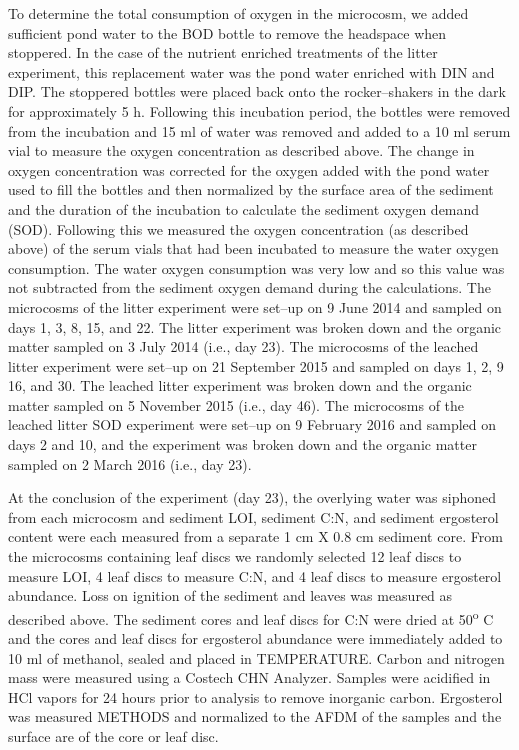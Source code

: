 To determine the total consumption of oxygen in the microcosm, we added sufficient pond water to the BOD bottle to remove the headspace when stoppered. In the case of the nutrient enriched treatments of the litter experiment, this replacement water was the pond water enriched with DIN and DIP. The stoppered bottles were placed back onto the rocker--shakers in the dark for approximately 5 h. Following this incubation period, the bottles were removed from the incubation and 15 ml of water was removed and added to a 10 ml serum vial to measure the oxygen concentration as described above. The change in oxygen concentration was corrected for the oxygen added with the pond water used to fill the bottles and then normalized by the surface area of the sediment and the duration of the incubation to calculate the sediment oxygen demand (SOD). Following this we measured the oxygen concentration (as described above) of the serum vials that had been incubated to measure the water oxygen consumption. The water oxygen consumption was very low and so this value was not subtracted from the sediment oxygen demand during the calculations. The microcosms of the litter experiment were set--up on 9 June 2014 and sampled on days 1, 3, 8, 15, and 22. The litter experiment was broken down and the organic matter sampled on 3 July 2014 (i.e., day 23). The microcosms of the leached litter experiment were set--up on 21 September 2015 and sampled on days 1, 2, 9 16, and 30. The leached litter experiment was broken down and the organic matter sampled on 5 November 2015 (i.e., day 46). The microcosms of the leached litter SOD experiment were set--up on 9 February 2016 and sampled on days 2 and 10, and the experiment was broken down and the organic matter sampled on 2 March 2016 (i.e., day 23).
 
At the conclusion of the experiment (day 23), the overlying water was siphoned from each microcosm and sediment LOI, sediment C:N, and sediment ergosterol content were each measured from a separate 1 cm X 0.8 cm sediment core.  From the microcosms containing leaf discs we randomly selected 12 leaf discs to measure LOI, 4 leaf discs to measure C:N, and 4 leaf discs to measure ergosterol abundance. Loss on ignition of the sediment and leaves was measured as described above. The sediment cores and leaf discs for C:N were dried at 50\textsuperscript{o} C and the cores and leaf discs for ergosterol abundance were immediately added to 10 ml of methanol, sealed and placed in TEMPERATURE. Carbon and nitrogen mass were measured using a Costech CHN Analyzer. Samples were acidified in HCl vapors for 24 hours prior to analysis to remove inorganic carbon.  Ergosterol was measured METHODS and normalized to the AFDM of the samples and the surface are of the core or leaf disc.  